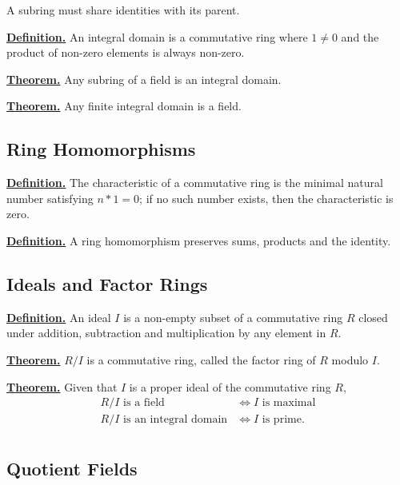 \documentclass{article}
\renewcommand\({\left(}
\renewcommand\){\right)}
\begin{document}
\vspace{6mm}
A subring must share identities with its parent.

\vspace{6mm}
\underline{\textbf{Definition.}} An integral domain is a commutative ring where $1\not=0$ and the product of non-zero elements is always non-zero.

\vspace{6mm}
\underline{\textbf{Theorem.}} Any subring of a field is an integral domain.

\vspace{6mm}
\underline{\textbf{Theorem.}} Any finite integral domain is a field.
\subsection{Ring Homomorphisms}
\underline{\textbf{Definition.}} The characteristic of a commutative ring is the minimal natural number satisfying $n*1=0$; if no such number exists, then the characteristic is zero.

\vspace{6mm}
\underline{\textbf{Definition.}} A ring homomorphism preserves sums, products and the identity.
\subsection{Ideals and Factor Rings}
\underline{\textbf{Definition.}} An ideal $I$ is a non-empty subset of a commutative ring $R$ closed under addition, subtraction and multiplication by any element in $R$.

\vspace{6mm}
\underline{\textbf{Theorem.}} $R/I$ is a commutative ring, called the factor ring of $R$ modulo $I$.

\vspace{6mm}
\underline{\textbf{Theorem.}} Given that $I$ is a proper ideal of the commutative ring $R$,
\begin{align*}
    R/I\text{ is a field}&\iff I\text{ is maximal}\\
    R/I\text{ is an integral domain}&\iff I\text{ is prime}.\\
\end{align*}
\subsection{Quotient Fields}
\end{document}
